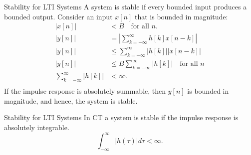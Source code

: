 \begin{frame}{Stability for LTI Systems}
A system is stable if every bounded input produces a bounded output. Consider an input $x[n]$ that is bounded in magnitude:
    \begin{align*}
        |x[n]| &< B \quad \text{for all } n.\\
      |y[n]| &= \left| \sum_{k=-\infty}^{\infty}h[k]x[n-k]\right| \\
      |y[n]| &\leq  \sum_{k=-\infty}^{\infty}|h[k]||x[n-k]|\\
      |y[n]| &\leq  B\sum_{k=-\infty}^{\infty}|h[k]|\quad \text{for all } n\\
      \sum_{k=-\infty}^{\infty}|h[k]| &< \infty.\\
    \end{align*}
    If the impulse response is absolutely summable, then $y[n]$ is bounded in magnitude, and hence, the system is stable.

\end{frame}

\begin{frame}{Stability for LTI Systems}
    In CT a system is stable if the impulse response is \alert{absolutely integrable}.
    \begin{equation*}
        \int_{-\infty}^{\infty}|h(\tau)|d\tau < \infty.
    \end{equation*}
\end{frame}




